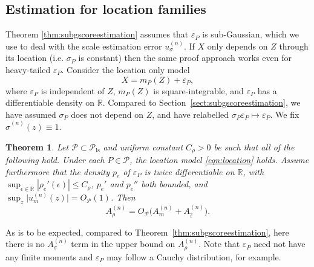 \documentclass[aos]{imsart}
\newcommand{\R}{\mathbb{R}}
\newtheorem{theorem}{Theorem}
\begin{document}
	
	\subsection{Estimation for location families}
	\label{sec:location}
	Theorem \ref{thm:subgscoreestimation} assumes that $\varepsilon_P$ is sub-Gaussian, which we use to deal with the scale estimation error $u_\sigma^{(n)}$. If $X$ only depends on $Z$ through its location (i.e. $\sigma_P$ is constant) then the same proof approach works even for heavy-tailed $\varepsilon_P$. Consider the location only model
	\begin{equation}
		X = m_P(Z) + \varepsilon_P, \label{eqn:location}
	\end{equation}
	where $\varepsilon_P$ is independent of $Z$, $m_P(Z)$ is square-integrable, and $\varepsilon_P$ has a differentiable density on $\R$. Compared to Section~\ref{sect:subgscoreestimation}, we have assumed $\sigma_P$ does not depend on $Z$, and have relabelled $\sigma_P\varepsilon_P\mapsto \varepsilon_P$. We fix $\hat\sigma^{(n)}(z) \equiv 1$.
	
	
	\begin{theorem}
		\label{thm:homscoreestimation}
		Let $\mathcal{P}\subset\mathcal{P}_{\text{ls}}$ and uniform constant $C_\rho>0$ be such that all of the following hold. Under each $P\in\mathcal{P}$, the location model \eqref{eqn:location} holds. Assume furthermore that the density $p_{e}$ of $\varepsilon_P$ is twice differentiable on $\R$, with
		$\sup_{\epsilon\in\R} |\rho_{e}'(\epsilon)|\leq C_\rho$, $p_{e}'$ and $ p_{e}''$ both bounded, and $\sup_{z}\big|u_m^{(n)}(z)\big| = O_{\mathcal{P}}(1)$.
		Then \begin{equation*}
			A_\rho^{(n)} = O_{\mathcal{P}} \big(A_m^{(n)} + A_{\hat\varepsilon}^{(n)}\big).
		\end{equation*}
	\end{theorem}
As is to be expected, compared to Theorem~\ref{thm:subgscoreestimation}, here there is no $A_\sigma^{(n)}$ term in the upper bound on $A_\rho^{(n)}$.
		Note that $\varepsilon_P$ need not have any finite moments and $\varepsilon_P$ may follow a Cauchy distribution, for example.
\end{document}
